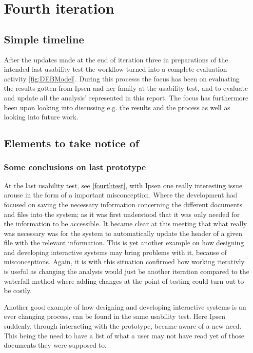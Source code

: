 \section{Fourth iteration}
\subsection{Simple timeline}\label{sec:3Iteration-timeline}
After the updates made at the end of iteration three in preparations of the intended last usability test the workflow turned into a complete evaluation activity \cref{fig:DEBModel}.
During this processs the focus has been on evaluating the results gotten from Ipsen and her family at the usability test, and to evaluate and update all the analysis' represented in this report.
The focus has furthermore been upon looking into discussing e.g. the results and the process as well as looking into future work. 

\subsection{Elements to take notice of}
\subsubsection*{Some conclusions on last prototype}
At the last usability test, see \cref{fourthtest}, with Ipsen one really interesting issue arouse in the form of a important misconception.
Where the development had focused on saving the necessary information concerning the different documents and files into the system; as it was first understood that it was only needed for the information to be accessible.
It became clear at this meeting that what really was necessary was for the system to automatically update the header of a given file  with the relevant information.
This is yet another example on how designing and developing interactive systems may bring problems with it, because of misconceptions.
Again, it is with this situation confirmed how working iterativly is useful as changing the analysis would just be another iteration compared to the waterfall method where adding changes at the point of testing could turn out to be costly.

Another good example of how designing and developing interactive systems is an ever changing process, can be found in the same usability test.
Here Ipsen suddenly, through interacting with the prototype, became aware of a new need.
This being the need to have a list of what a user may not have read yet of those documents they were supposed to.
